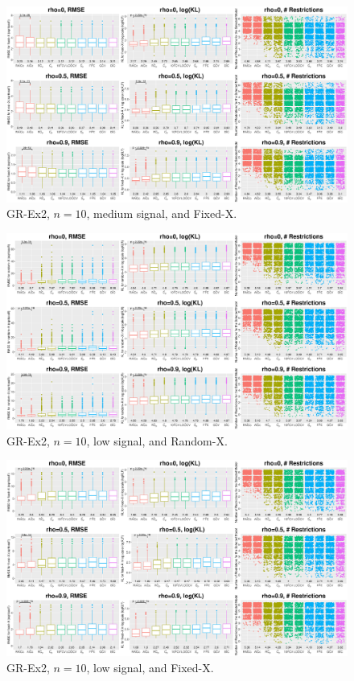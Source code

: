 \begin{figure}[!ht]
\centering
\includegraphics[width=\textwidth]{figures/supplement/fixedx_GR-Ex2_n10_msnr.eps}
\caption{GR-Ex2, $n=10$, medium signal, and Fixed-X.}
\end{figure}
\clearpage
\begin{figure}[!ht]
\centering
\includegraphics[width=\textwidth]{figures/supplement/randomx_GR-Ex2_n10_lsnr.eps}
\caption{GR-Ex2, $n=10$, low signal, and Random-X.}
\end{figure}
\begin{figure}[!ht]
\centering
\includegraphics[width=\textwidth]{figures/supplement/fixedx_GR-Ex2_n10_lsnr.eps}
\caption{GR-Ex2, $n=10$, low signal, and Fixed-X.}
\end{figure}
